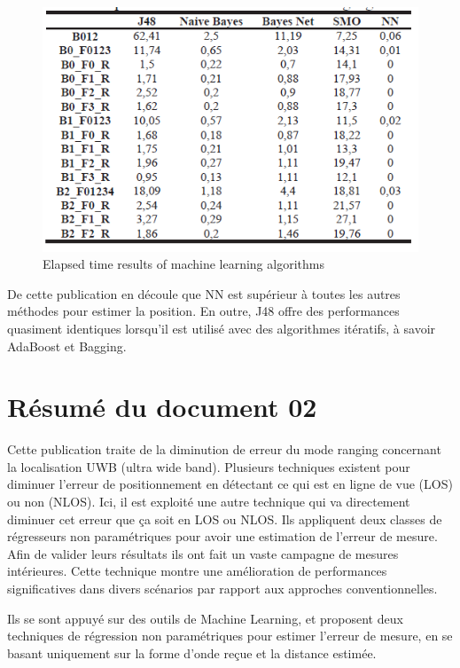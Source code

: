 \begin{figure}[H]
	\begin{center}
		\includegraphics[scale=1]{figures/time.png}
		\caption{Elapsed time results of machine learning algorithms}
		\label{fig:time} %
	\end{center}
\end{figure}

De cette publication en découle que NN est supérieur à toutes les autres méthodes pour estimer la position. En outre, J48 offre des performances quasiment identiques lorsqu'il est utilisé avec des algorithmes itératifs, à savoir AdaBoost et Bagging.

\section{Résumé du document 02}
Cette publication traite de la diminution de erreur du mode ranging concernant la localisation UWB (ultra wide band). Plusieurs techniques existent pour diminuer l'erreur de positionnement en détectant ce qui est en ligne de vue (LOS) ou non (NLOS). Ici, il est exploité une autre technique qui va directement diminuer cet erreur que ça soit en LOS ou NLOS. Ils appliquent deux classes de régresseurs non paramétriques pour avoir une estimation de l'erreur de mesure. Afin de valider leurs résultats ils ont fait un vaste campagne de mesures intérieures. Cette technique montre une amélioration de performances significatives dans divers scénarios par rapport aux approches conventionnelles. 

Ils se sont appuyé sur des outils de Machine Learning, et proposent deux techniques de régression non paramétriques pour estimer l’erreur de mesure, en se basant uniquement sur la forme d’onde reçue et la distance estimée.


